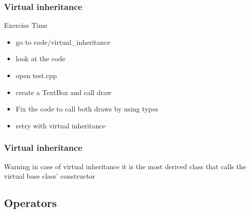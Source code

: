 \begin{frame}[fragile]
  \frametitle{Virtual inheritance}
  \begin{alertblock}{Exercise Time}
    \begin{itemize}
    \item go to code/virtual\_inheritance
    \item look at the code
    \item open test.cpp
    \item create a TextBox and call draw
    \item Fix the code to call both draws by using types
    \item retry with virtual inheritance
    \end{itemize}
  \end{alertblock}
\end{frame}

\begin{frame}[fragile]
  \frametitle{Virtual inheritance}
  \begin{alertblock}{Warning}
    in case of virtual inheritance it is the most derived class that calls the virtual base class' constructor
  \end{alertblock}
\end{frame}


\subsection{Operators}

